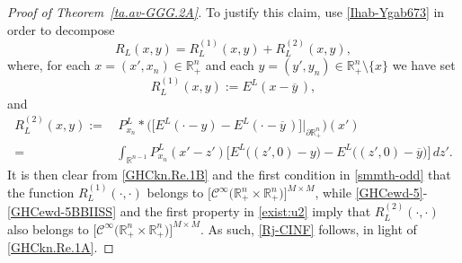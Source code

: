 \documentclass[11pt,reqno]{amsart}
\numberwithin{equation}{section}
\theoremstyle{remark}
\begin{document}
\begin{proof}[Proof of Theorem~\ref{ta.av-GGG.2A}]
To justify this claim, use \eqref{Ihab-Ygab673} in order to decompose 
%
\begin{equation}\label{GHCkn.Re.1A}
R_L(x,y)= R^{(1)}_L(x,y)+R^{(2)}_L(x,y),
\end{equation}
%
where, for each $x=(x',x_n)\in{\mathbb{R}}^n_{+}$ and each 
$y=(y',y_n)\in{\mathbb{R}}^n_{+}\setminus\{x\}$ we have set
%
\begin{equation}\label{GHCkn.Re.1B}
R^{(1)}_L(x,y):=E^L(x-\overline{y}\,),
\end{equation}
%
and 
%
\begin{align}\label{GHCkn.Re.1C}
R^{(2)}_L(x,y):=&\,P^L_{x_n}\ast\Big(\big[E^L(\cdot-y)-E^L(\cdot-\overline{y}\,)\big]
\big|_{\partial{\mathbb{R}}^n_{+}}\Bigr)(x')
\nonumber\\[4pt]
=& \int_{{\mathbb{R}}^{n-1}}P^L_{x_n}(x'-z')\big[E^L\big((z',0)-y\big)
-E^L\big((z',0)-\overline{y}\big)\big]\,dz'.
\end{align}
%
It is then clear from \eqref{GHCkn.Re.1B} and the first condition in \eqref{smmth-odd} that 
the function $R^{(1)}_L(\cdot,\cdot)$ belongs to 
$\big[{\mathscr{C}}^\infty\big({\mathbb{R}}^n_{+}\times{\mathbb{R}}^n_{+}\big)\big]^{M\times M}$, while 
\eqref{GHCewd-5}-\eqref{GHCewd-5BBIISS} and the first property in \eqref{exist:u2} imply that $R^{(2)}_L(\cdot,\cdot)$ 
also belongs to $\big[{\mathscr{C}}^\infty\big({\mathbb{R}}^n_{+}\times{\mathbb{R}}^n_{+}\big)\big]^{M\times M}$. 
As such, \eqref{Rj-CINF} follows, in light of \eqref{GHCkn.Re.1A}. 


\end{proof}
\end{document}
